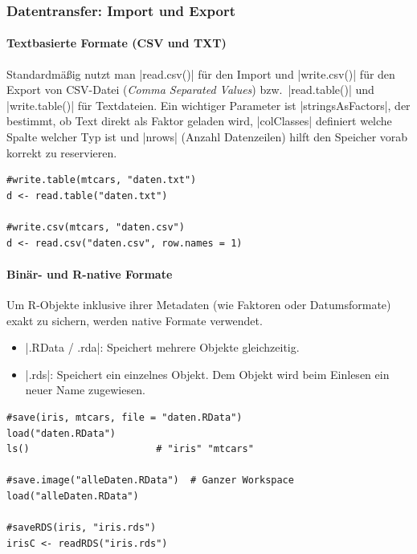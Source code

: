 \documentclass[10pt,twocolumn]{scrartcl}
\renewcommand{\lstinline}{\mycoloredinline}
\begin{document}
\subsubsection{Datentransfer: Import und Export}

\paragraph{Textbasierte Formate (CSV und TXT)}

Standardmäßig nutzt man \lstinline|read.csv()| für den Import und \lstinline|write.csv()| für den Export von CSV-Datei (\emph{Comma Separated Values}) bzw.\ \lstinline|read.table()| und \lstinline|write.table()| für Textdateien. Ein wichtiger Parameter ist \lstinline|stringsAsFactors|, der bestimmt, ob Text direkt als Faktor geladen wird, \lstinline|colClasses| definiert welche Spalte welcher Typ ist und \lstinline|nrows| (Anzahl Datenzeilen) hilft den Speicher vorab korrekt zu reservieren.

\begin{lstlisting}
#write.table(mtcars, "daten.txt")
d <- read.table("daten.txt")

#write.csv(mtcars, "daten.csv")
d <- read.csv("daten.csv", row.names = 1)
\end{lstlisting}

\paragraph{Binär- und R-native Formate}

Um R-Objekte inklusive ihrer Metadaten (wie Faktoren oder Datumsformate) exakt zu sichern, werden native Formate verwendet.

\begin{itemize}
\item \lstinline|.RData / .rda|: Speichert mehrere Objekte gleichzeitig.
\item \lstinline|.rds|: Speichert ein einzelnes Objekt. Dem Objekt wird beim Einlesen ein neuer Name zugewiesen.
\end{itemize}

\begin{lstlisting}
#save(iris, mtcars, file = "daten.RData")
load("daten.RData")
ls()                      # "iris" "mtcars"

#save.image("alleDaten.RData")  # Ganzer Workspace
load("alleDaten.RData")

#saveRDS(iris, "iris.rds")
irisC <- readRDS("iris.rds")
\end{lstlisting}
\end{document}
